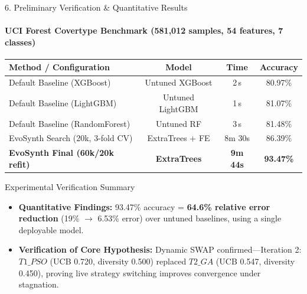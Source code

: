 \documentclass[aspectratio=169, 11pt]{beamer}
\begin{document}
\begin{frame}{6. Preliminary Verification \& Quantitative Results}
    \framesubtitle{UCI Forest Covertype Benchmark (581,012 samples, 54 features, 7 classes)}
    \begin{table}
        \centering
        \scriptsize
        \renewcommand{\arraystretch}{1.15}
        \begin{tabular}{p{4.8cm} c c c}
            \toprule
            \textbf{Method / Configuration} & \textbf{Model} & \textbf{Time} & \textbf{Accuracy} \\
            \midrule
            Default Baseline (XGBoost) & Untuned XGBoost & 2\,s & 80.97\% \\
            Default Baseline (LightGBM) & Untuned LightGBM & 1\,s & 81.07\% \\
            Default Baseline (RandomForest) & Untuned RF & 3\,s & 81.48\% \\
            \midrule
            EvoSynth Search (20k, 3-fold CV) & ExtraTrees + FE & 8m 30s & 86.39\% \\
            \textbf{EvoSynth Final (60k/20k refit)} & \textbf{ExtraTrees} & \textbf{9m 44s} & \textbf{93.47\%} \\
            \bottomrule
        \end{tabular}
    \end{table}
    \vspace{-0.15cm}

    \begin{block}{Experimental Verification Summary}
        \scriptsize
        \begin{itemize}
            \setlength{\itemsep}{1.5pt}
            \item \textbf{Quantitative Findings:} 93.47\% accuracy = \textbf{64.6\% relative error reduction} (19\% $\to$ 6.53\% error) over untuned baselines, using a single deployable model.
            \item \textbf{Verification of Core Hypothesis:} Dynamic SWAP confirmed---Iteration 2: $T1\_PSO$ (UCB 0.720, diversity 0.500) replaced $T2\_GA$ (UCB 0.547, diversity 0.450), proving live strategy switching improves convergence under stagnation.
        \end{itemize}
    \end{block}
\end{frame}
\end{document}
